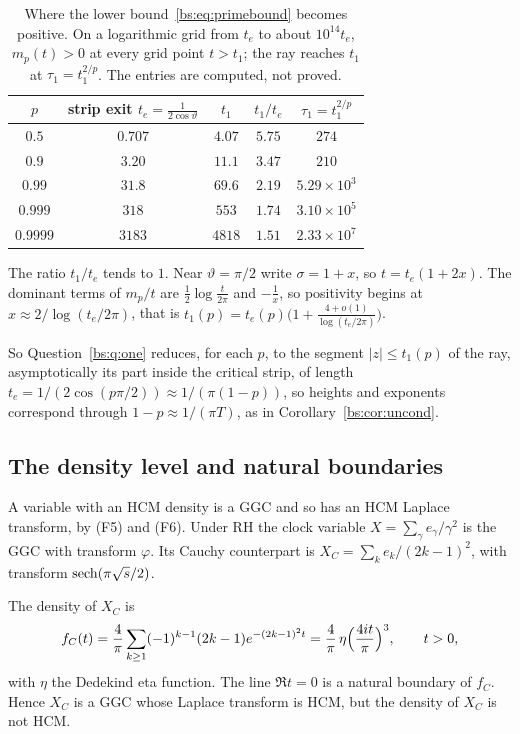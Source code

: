 \begin{table}[h]
\centering
\begin{tabular}{ccccc}
\toprule
$p$ & strip exit $t_e=\frac1{2\cos\vartheta}$ & $t_1$ & $t_1/t_e$ & $\tau_1=t_1^{2/p}$\\
\midrule
$0.5$ & $0.707$ & $4.07$ & $5.75$ & $274$\\
$0.9$ & $3.20$ & $11.1$ & $3.47$ & $210$\\
$0.99$ & $31.8$ & $69.6$ & $2.19$ & $5.29\times10^3$\\
$0.999$ & $318$ & $553$ & $1.74$ & $3.10\times10^5$\\
$0.9999$ & $3183$ & $4818$ & $1.51$ & $2.33\times10^7$\\
\bottomrule
\end{tabular}
\caption{Where the lower bound~\eqref{bs:eq:primebound} becomes positive. On a logarithmic grid from $t_e$ to about $10^{14}t_e$, $m_p(t)>0$ at every grid point $t>t_1$; the ray reaches $t_1$ at $\tau_1=t_1^{2/p}$. The entries are computed, not proved.}
\label{bs:tab:prime}
\end{table}

\begin{remark}
The ratio $t_1/t_e$ tends to $1$. Near $\vartheta=\pi/2$ write $\sigma=1+x$, so $t=t_e(1+2x)$. The dominant terms of $m_p/t$ are $\frac12\log\frac t{2\pi}$ and $-\frac1x$, so positivity begins at $x\approx2/\log(t_e/2\pi)$, that is $t_1(p)=t_e(p)\bigl(1+\frac{4+o(1)}{\log(t_e/2\pi)}\bigr)$.
\end{remark}

So Question~\ref{bs:q:one} reduces, for each $p$, to the segment $|z|\le t_1(p)$ of the ray, asymptotically its part inside the critical strip, of length $t_e=1/(2\cos(p\pi/2))\approx1/(\pi(1-p))$, so heights and exponents correspond through $1-p\approx1/(\pi T)$, as in Corollary~\ref{bs:cor:uncond}.

\subsection{The density level and natural boundaries}

A variable with an HCM density is a GGC and so has an HCM Laplace transform, by (F5) and (F6). Under RH the clock variable $X=\sum_\gamma e_\gamma/\gamma^2$ is the GGC with transform $\varphi$. Its Cauchy counterpart is $X_C=\sum_ke_k/(2k-1)^2$, with transform $\operatorname{sech}(\pi\sqrt s/2)$.

\begin{theorem}\label{bs:thm:eta}
The density of $X_C$ is
\[
f_C(t)=\frac4\pi\sum_{k\ge1}(-1)^{k-1}(2k-1)e^{-(2k-1)^2t}=\frac4\pi\,\eta\Bigl(\frac{4it}{\pi}\Bigr)^3,\qquad t>0,
\]
with $\eta$ the Dedekind eta function. The line $\Re t=0$ is a natural boundary of $f_C$. Hence $X_C$ is a GGC whose Laplace transform is HCM, but the density of $X_C$ is not HCM.
\end{theorem}

